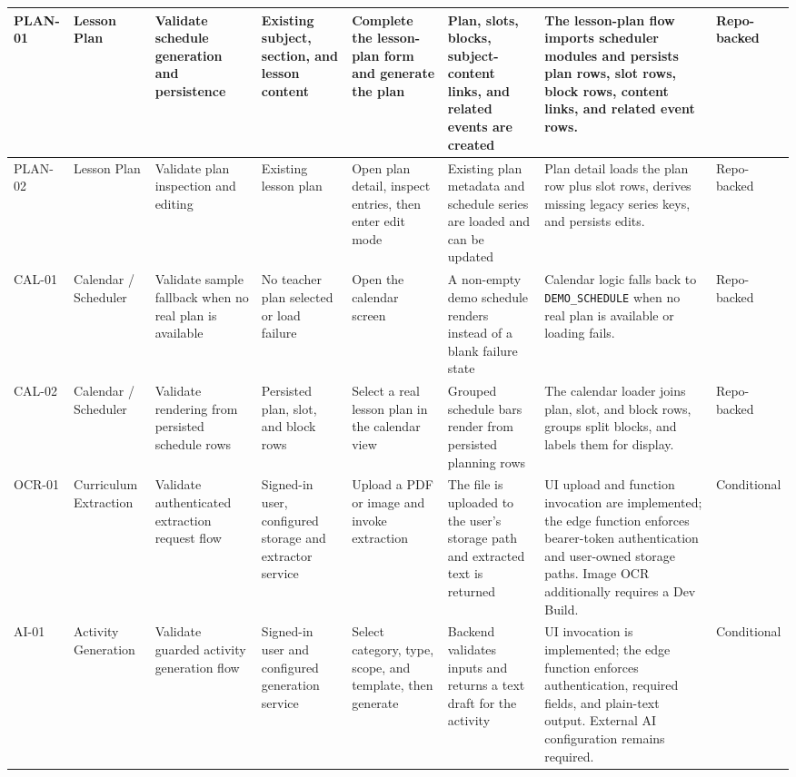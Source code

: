 \documentclass[12pt]{article}
\begin{document}
\begin{longtable}{|L{0.9cm}|L{1.7cm}|L{1.9cm}|L{1.6cm}|L{2.5cm}|L{2.4cm}|L{2.3cm}|L{1.4cm}|}
\hline
PLAN-01 & Lesson Plan & Validate schedule generation and persistence & Existing subject, section, and lesson content & Complete the lesson-plan form and generate the plan & Plan, slots, blocks, subject-content links, and related events are created & The lesson-plan flow imports scheduler modules and persists plan rows, slot rows, block rows, content links, and related event rows. & Repo-backed \\
\hline
PLAN-02 & Lesson Plan & Validate plan inspection and editing & Existing lesson plan & Open plan detail, inspect entries, then enter edit mode & Existing plan metadata and schedule series are loaded and can be updated & Plan detail loads the plan row plus slot rows, derives missing legacy series keys, and persists edits. & Repo-backed \\
\hline
CAL-01 & Calendar / Scheduler & Validate sample fallback when no real plan is available & No teacher plan selected or load failure & Open the calendar screen & A non-empty demo schedule renders instead of a blank failure state & Calendar logic falls back to \texttt{DEMO\_SCHEDULE} when no real plan is available or loading fails. & Repo-backed \\
\hline
CAL-02 & Calendar / Scheduler & Validate rendering from persisted schedule rows & Persisted plan, slot, and block rows & Select a real lesson plan in the calendar view & Grouped schedule bars render from persisted planning rows & The calendar loader joins plan, slot, and block rows, groups split blocks, and labels them for display. & Repo-backed \\
\hline
OCR-01 & Curriculum Extraction & Validate authenticated extraction request flow & Signed-in user, configured storage and extractor service & Upload a PDF or image and invoke extraction & The file is uploaded to the user's storage path and extracted text is returned & UI upload and function invocation are implemented; the edge function enforces bearer-token authentication and user-owned storage paths. Image OCR additionally requires a Dev Build. & Conditional \\
\hline
AI-01 & Activity Generation & Validate guarded activity generation flow & Signed-in user and configured generation service & Select category, type, scope, and template, then generate & Backend validates inputs and returns a text draft for the activity & UI invocation is implemented; the edge function enforces authentication, required fields, and plain-text output. External AI configuration remains required. & Conditional \\
\hline
\end{longtable}
\endgroup
\end{document}
